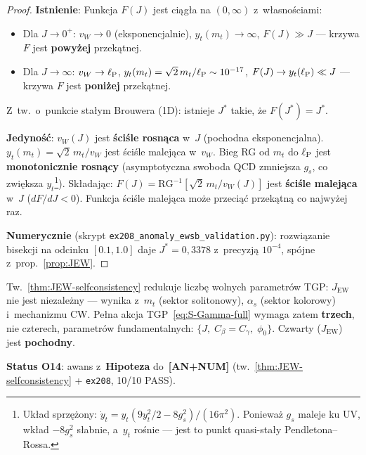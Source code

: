 \begin{proof}
\textbf{Istnienie}:
Funkcja $F(J)$ jest ci\k{a}g\l{}a na $(0, \infty)$ z~w\l{}asno\'sciami:
\begin{itemize}[nosep]
  \item Dla $J \to 0^+$: $v_W \to 0$ (eksponencjalnie),
    $y_t(m_t) \to \infty$, $F(J) \gg J$ --- krzywa $F$ jest
    \textbf{powy\.zej} przek\k{a}tnej.
  \item Dla $J \to \infty$: $v_W \to \ell_{\mathrm{P}}$,
    $y_t(m_t) = \sqrt{2}\,m_t/\ell_{\mathrm{P}} \sim 10^{-17}$,
    $F(J) \to y_t(\ell_{\mathrm{P}}) \ll J$ --- krzywa $F$ jest
    \textbf{poni\.zej} przek\k{a}tnej.
\end{itemize}
Z~tw.~o~punkcie sta\l{}ym Brouwera (1D): istnieje $J^*$
takie, \.ze $F(J^*) = J^*$.

\textbf{Jedyno\'s\'c}:
$v_W(J)$ jest \textbf{\'sci\'sle rosn\k{a}ca} w~$J$ (pochodna
eksponencjalna).
$y_t(m_t) = \sqrt{2}\,m_t / v_W$ jest \'sci\'sle malej\k{a}ca
w~$v_W$.
Bieg RG od $m_t$ do $\ell_{\mathrm{P}}$ jest \textbf{monotonicznie rosn\k{a}cy}
(asymptotyczna swoboda QCD zmniejsza $g_s$, co zwi\k{e}ksza
$y_t$\footnote{Uk\l{}ad sprz\k{e}\.zony: $\dot{y}_t = y_t(9y_t^2/2
- 8g_s^2)/(16\pi^2)$. Poniewa\.z $g_s$ maleje ku UV, wk\l{}ad
$-8g_s^2$ s\l{}abnie, a~$y_t$ ro\'snie --- jest to punkt
quasi-sta\l{}y Pendletona--Rossa.}).
Sk\l{}adaj\k{a}c: $F(J) = \mathrm{RG}^{-1}[\sqrt{2}\,m_t / v_W(J)]$
jest \textbf{\'sci\'sle malej\k{a}ca} w~$J$ ($dF/dJ < 0$).
Funkcja \'sci\'sle malej\k{a}ca mo\.ze przeci\k{a}\'c przek\k{a}tn\k{a}
co najwy\.zej raz.

\textbf{Numerycznie} (skrypt \texttt{ex208\_anomaly\_ewsb\_validation.py}):
rozwi\k{a}zanie bisekcji na odcinku $[0.1, 1.0]$ daje
$J^* = 0{,}3378$ z~precyzj\k{a} $10^{-4}$, sp\'ojne
z~prop.~\ref{prop:JEW}.
\end{proof}

\begin{remark}\label{rem:JEW-parameter-count}
Tw.~\ref{thm:JEW-selfconsistency} redukuje liczb\k{e} wolnych
parametr\'ow TGP: $J_{\mathrm{EW}}$ nie jest niezale\.zny ---
wynika z~$m_t$ (sektor solitonowy), $\alpha_s$ (sektor kolorowy)
i~mechanizmu CW. Pe\l{}na akcja TGP~\eqref{eq:S-Gamma-full}
wymaga zatem \textbf{trzech}, nie czterech, parametr\'ow
fundamentalnych: $\{J,\; C_\beta = C_\gamma,\; \phi_0\}$.
Czwarty ($J_{\mathrm{EW}}$) jest \textbf{pochodny}.

\medskip\noindent
\textbf{Status O14}: awans z~\textbf{Hipoteza} do~\textbf{[AN+NUM]}
(tw.~\ref{thm:JEW-selfconsistency} + \texttt{ex208}, 10/10 PASS).
\end{remark}

